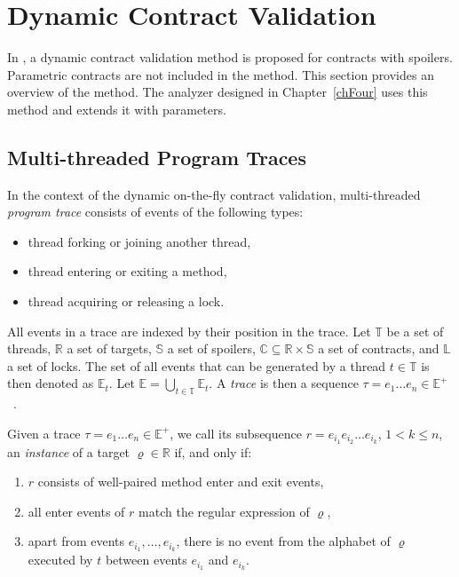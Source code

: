 \section{Dynamic Contract Validation}

In \cite{contracts}, a dynamic contract validation method is proposed for
contracts with spoilers. Parametric contracts are not included in the method.
This section provides an overview of the method. The analyzer designed in
Chapter~\ref{chFour} uses this method and extends it with parameters.

\subsection{Multi-threaded Program Traces}

In the context of the dynamic on-the-fly contract validation, multi-threaded
\emph{program trace} consists of events of the following types:
\begin{itemize}
    \item thread forking or joining another thread,
    \item thread entering or exiting a method,
    \item thread acquiring or releasing a lock.
\end{itemize}

All events in a trace are indexed by their position in the trace. Let
$\mathbb{T}$ be a set of threads, $\mathbb{R}$ a set of targets, $\mathbb{S}$ a
set of spoilers, $\mathbb{C} \subseteq \mathbb{R} \times \mathbb{S}$ a set of
contracts, and $\mathbb{L}$ a set of locks. The set of all events that can be
generated by a thread $t \in \mathbb{T}$ is then denoted as $\mathbb{E}_t$. Let
$\mathbb{E} = \bigcup_{t \in \mathbb{T}} \mathbb{E}_t$. A \emph{trace} is then a
sequence $\tau = e_1 \hdots e_n \in \mathbb{E}^+$~\cite{contracts}.


Given a trace $\tau = e_1 \hdots e_n \in \mathbb{E}^+$, we call its subsequence
$r = e_{i_1} e_{i_2} \hdots e_{i_k}$, $1 < k \leq n$, an \emph{instance} of a
target $\varrho \in \mathbb{R}$ if, and only if:
\begin{enumerate}
    \item $r$ consists of well-paired method enter and exit events,
    \item all enter events of $r$ match the regular expression of $\varrho$,
    \item apart from events $e_{i_1},\ldots,e_{i_k}$, there is no event from the
        alphabet of $\varrho$ executed by $t$ between events $e_{i_1}$ and
        $e_{i_k}$.
\end{enumerate}

